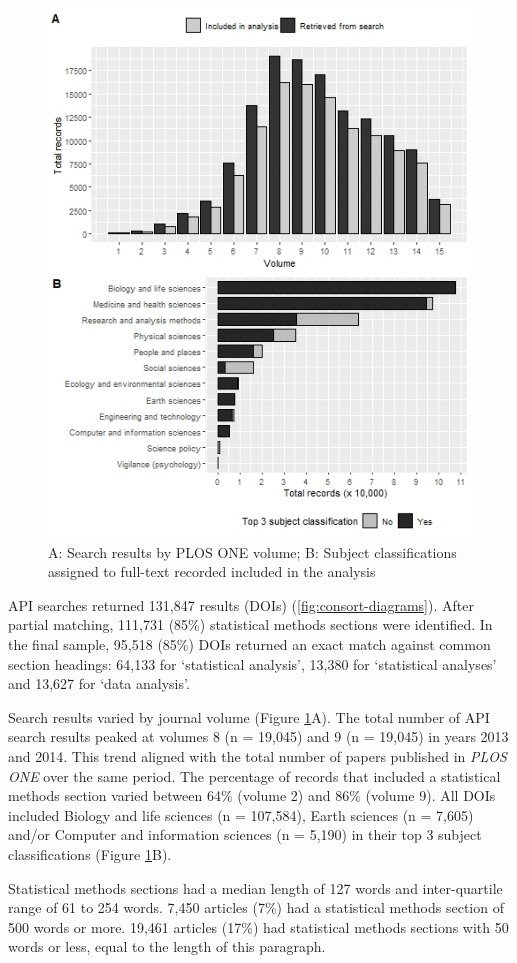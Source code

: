 \documentclass[12pt]{article}
\begin{document}
\begin{figure}

{\centering \includegraphics[width=0.6\linewidth]{figures/plos_summary} 

}

\caption{\label{fig:plos-n} A: Search results by PLOS ONE volume; B: Subject classifications assigned to full-text recorded included in the analysis}
\end{figure}

API searches returned 131,847 results (DOIs)
(\autoref{fig:consort-diagrams}). After partial matching, 111,731 (85\%)
statistical methods sections were identified. In the final sample,
95,518 (85\%) DOIs returned an exact match against common section
headings: 64,133 for `statistical analysis', 13,380 for `statistical
analyses' and 13,627 for `data analysis'.

Search results varied by journal volume (Figure \ref{fig:plos-n}A). The
total number of API search results peaked at volumes 8 (n = 19,045) and
9 (n = 19,045) in years 2013 and 2014. This trend aligned with the total
number of papers published in \emph{PLOS ONE} over the same period. The
percentage of records that included a statistical methods section varied between 64\%
(volume 2) and 86\% (volume 9). All DOIs included Biology and life
sciences (n = 107,584), Earth sciences (n = 7,605) and/or Computer and
information sciences (n = 5,190) in their top 3 subject classifications
(Figure \ref{fig:plos-n}B).

Statistical methods sections had a median length of 127 words and
inter-quartile range of 61 to 254 words. 7,450 articles (7\%) had a
statistical methods section of 500 words or more. 19,461 articles (17\%)
had statistical methods sections with 50 words or less, equal to the
length of this paragraph.
\end{document}
